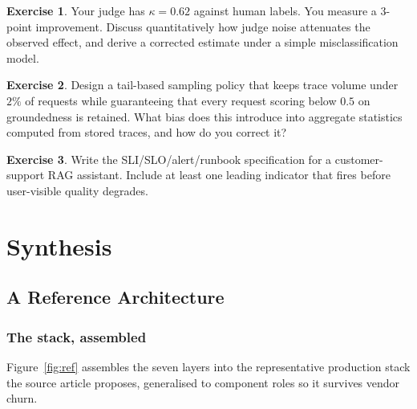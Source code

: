 \documentclass[11pt,twoside,openright]{book}
\theoremstyle{definition}
\newtheorem{exercise}{Exercise}[chapter]
\theoremstyle{plain}
\theoremstyle{remark}
\begin{document}
\begin{exercise}
Your judge has $\kappa = 0.62$ against human labels. You measure a $3$-point
improvement. Discuss quantitatively how judge noise attenuates the observed
effect, and derive a corrected estimate under a simple misclassification model.
\end{exercise}

\begin{exercise}
Design a tail-based sampling policy that keeps trace volume under $2\%$ of
requests while guaranteeing that every request scoring below $0.5$ on
groundedness is retained. What bias does this introduce into aggregate
statistics computed from stored traces, and how do you correct it?
\end{exercise}

\begin{exercise}
Write the SLI/SLO/alert/runbook specification for a customer-support RAG
assistant. Include at least one leading indicator that fires before user-visible
quality degrades.
\end{exercise}

\cleardoublepage

\part{Synthesis}
\label{part:synthesis}

\chapter{A Reference Architecture}
\label{ch:reference}

\section{The stack, assembled}

Figure~\ref{fig:ref} assembles the seven layers into the representative
production stack the source article proposes, generalised to component roles so
it survives vendor churn.
\end{document}
